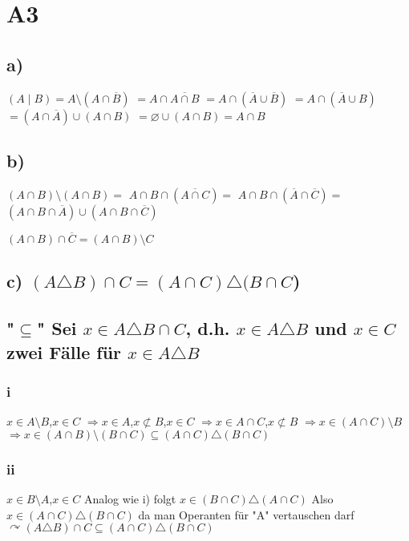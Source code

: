 \documentclass[11pt]{scrartcl}
\begin{document}
\section{A3}
\label{sec:A3}
\subsection{a)}
$(A \mid B)= A\setminus (A \cap \overline{B})$
$ = A\cap  \overline{A\cap B}$
$= A\cap (\overline{A} \cup \overline{B})$
$= A\cap (\overline{A} \cup B)$
$= (A \cap \overline{A}) \cup (A \cap B)$
$= \varnothing \cup (A \cap B)= A \cap B$

\subsection{b)}
$(A \cap B) \setminus (A \cap B)=$
$A \cap B \cap (\overline{A \cap C})=$
$A \cap B \cap (\overline{A} \cap \overline{C}) =$
$(A \cap B \cap \overline{A}) \cup (A \cap B \cap \overline{C})$
\begin{flushleft}
$(A \cap B) \cap \overline{C} = (A \cap B) \setminus C$
\end{flushleft}

\subsection{c) $(A \triangle B) \cap C = (A \cap C) \triangle (B \cap C$)}

\subsection*{"$\subseteq$"  Sei $x \in A \triangle B \cap C$, d.h. $x \in A \triangle B$ und $x \in C$ zwei Fälle für $x \in A \triangle B$}


\subsubsection{i}
$x \in A \setminus B$,$x \in C$
$\Rightarrow x \in A$,$x \not\subset B$,$x \in C$
$\Rightarrow x \in A \cap C$,$x \not\subset B$
$\Rightarrow x \in (A \cap C) \setminus B$
$\Rightarrow x \in (A \cap B) \setminus (B \cap C) \subseteq (A \cap C) \triangle (B \cap C)$


\subsubsection{ii}
$x \in B \setminus A$,$x \in C$ Analog wie i) folgt $x \in (B \cap C) \triangle (A \cap C)$ Also $x \in (A \cap C) \triangle (B \cap C)$ da man Operanten für "A" vertauschen darf
$\curvearrowright (A \triangle B) \cap C \subseteq (A \cap C) \triangle (B \cap C)$
\end{document}

